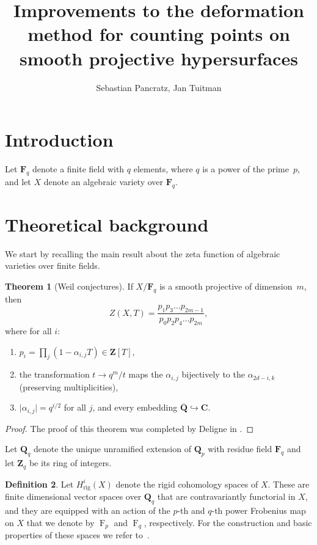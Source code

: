 \documentclass[a4paper,11pt]{article}
\author{Sebastian Pancratz, Jan Tuitman}
\title{Improvements to the deformation method for counting points 
on smooth projective hypersurfaces}
\numberwithin{equation}{section}
\providecommand{\abs}[1]{\lvert#1\rvert}                 %
\newcommand{\ZZ}{\mathbf{Z}} %
\newcommand{\QQ}{\mathbf{Q}} %
\newcommand{\CC}{\mathbf{C}} %
\newcommand{\FF}{\mathbf{F}} %
\DeclareMathOperator{\Frob}{F}           %
\providecommand{\Hrig}{H_{\text{rig}}}  %
\theoremstyle{definition}
\newtheorem{thm}{Theorem}[section]
\newtheorem{defn}[thm]{Definition}
\begin{document}
\maketitle

\tableofcontents


\section{Introduction}
\label{sec:Introduction}

Let $\FF_q$ denote a finite field with $q$ elements, where $q$ is a power of 
the prime~$p$, and let $X$ denote an algebraic variety over $\FF_q$.

\section{Theoretical background}
\label{sec:Background}

We start by recalling the main result about the zeta function of algebraic
varieties over finite fields.

\begin{thm}[Weil conjectures] If $X/\FF_q$ is a smooth projective of 
dimension~$m$, then \label{thm:weildeligne}
\[
Z(X,T)=\frac{p_1 p_3 \ldots p_{2m-1}}{p_0 p_2 p_4 \ldots p_{2m}},
\]
where for all $i$:
\begin{enumerate}
\item $p_i = \prod_j (1-\alpha_{i,j}T) \in \ZZ[T]$,
\item the transformation $t \rightarrow q^m/t$ maps the $\alpha_{i,j}$ 
      bijectively to the $\alpha_{2d-i,k}$ (preserving multiplicities),
\item $\abs{\alpha_{i,j}} = q^{i/2}$ for all $j$, and every embedding 
      $\overline{\QQ} \hookrightarrow \CC$. 
\end{enumerate}
\end{thm}

\begin{proof}
The proof of this theorem was completed by Deligne in \cite{Deligne1974}.
\end{proof}

Let $\QQ_q$ denote the unique unramified extension of $\QQ_p$ with 
residue field $\FF_q$ and let $\ZZ_q$ be its ring of integers.

\begin{defn}
Let $\Hrig^{i}(X)$ denote the rigid
cohomology spaces of $X$. These are finite dimensional vector spaces 
over $\QQ_q$ that are contravariantly functorial in $X$, and they are 
equipped with an action of the $p$-th and $q$-th power Frobenius map 
on $X$ that we denote by $\Frob_p$ and $\Frob_q$, respectively. For the 
construction and basic properties of these spaces we refer 
to~\cite{Berthelot1986}.
\end{defn}
\end{document}
